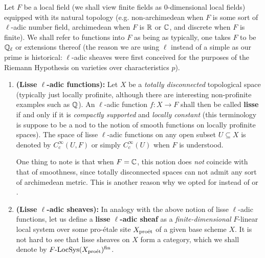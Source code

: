             \begin{definition} \label{def: lisse_sheaves}
                Let $F$ be a local field (we shall view finite fields as $0$-dimensional local fields) equipped with its natural topology (e.g. non-archimedean when $F$ is some sort of $\ell$-adic number field, archimedean when $F$ is $\mathbb{R}$ or $\mathbb{C}$, and discrete when $F$ is finite). We shall refer to functions into $F$ as being  as typically, one takes $F$ to be $\mathbb{Q}_{\ell}$ or extensions thereof (the reason we are using $\ell$ instead of a simple  as our prime is historical: $\ell$-adic sheaves were first conceived for the purposes of the Riemann Hypothesis on varieties over characteristics $p$).
                \begin{enumerate}
                    \item \textbf{(Lisse $\ell$-adic functions):} Let $X$ be a \textit{totally disconnected} topological space (typically just locally profinite, although there are interesting non-profinite examples such as $\mathbb{Q}$). An $\ell$-adic function $f: X \to F$ shall then be called \textbf{lisse} if and only if it is \textit{compactly supported} and \textit{locally constant} (this terminology is suppose to be a nod to the notion of smooth functions on locally profinite spaces). The space of lisse $\ell$-adic functions on any open subset $U \subseteq X$ is denoted by $C^{\infty}_c(U, F)$ or simply $C^{\infty}_c(U)$ when $F$ is understood.
                    
                    One thing to note is that when $F = \mathbb{C}$, this notion does \textit{not} coincide with that of smoothness, since totally disconnected spaces can not admit any sort of archimedean metric. This is another reason why we opted for  instead of  or .
                    \item \textbf{(Lisse $\ell$-adic sheaves):} In analogy with the above notion of lisse $\ell$-adic functions, let us define a \textbf{lisse $\ell$-adic sheaf} as a \textit{finite-dimensional} $F$-linear local system over some pro-\'etale site $X_{\mathrm{pro\acute{e}t}}$ of a given base scheme $X$. It is not hard to see that lisse sheaves on $X$ form a category, which we shall denote by $F\text{-}\mathrm{LocSys}(X_{\mathrm{pro\acute{e}t}})^{\mathrm{fin}}$.
                \end{enumerate}
            \end{definition}
        
